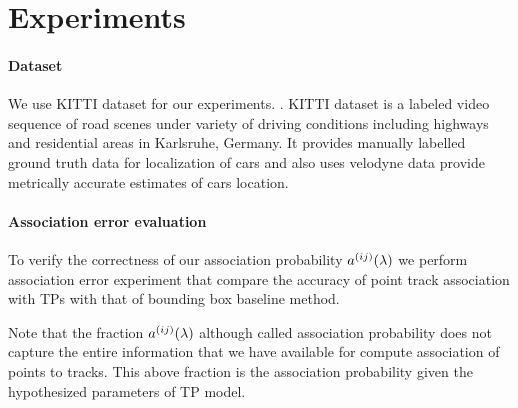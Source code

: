 \section{Experiments}
\label{sec:experiments}


\paragraph{Dataset} We use KITTI dataset for our experiments.  \cite{geiger2013vision}. KITTI dataset is a labeled video sequence of road scenes under variety of driving conditions including highways and residential areas in Karlsruhe, Germany. It provides manually labelled ground truth data for localization of cars and also uses velodyne data provide metrically accurate estimates of cars location.


\paragraph{Association error evaluation}

To verify the correctness of our association probability $a^{(ij)}(\lambda)$ we perform
association error experiment that compare the accuracy of point track
association with TPs with that of bounding box baseline method.

% 

Note that the fraction $a^{(ij)}(\lambda)$ although called association probability does
not capture the entire information that we have available for compute
association of points to tracks. This above fraction is the association
probability given the hypothesized parameters of TP model. 

